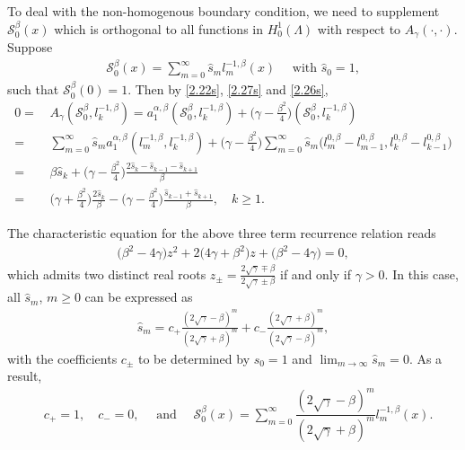 \documentclass[10pt,reqno]{amsart}
\theoremstyle{remark}
\theoremstyle{definition}
\begin{document}
To deal with the non-homogenous boundary condition,  we need to
supplement $\mathcal{S}_0^{\beta}(x)$   which is  orthogonal to all functions in  $H^{1}_0(\Lambda)$ with respect to $A_{\gamma}(\cdot,\cdot)$.
Suppose
\begin{align*}
\mathcal{S}_0^{\beta}(x) = \sum_{m=0}^{\infty}\hat s_m l_m^{-1,\beta}(x) \quad \text{ with }  \hat s_0 = 1,
\end{align*}
such that $\mathcal{S}_0^{\beta}(0)=1$.
Then by \eqref{2.22s}, \eqref{2.27s} and \eqref{2.26s},
\begin{align*}
0 =&\, A_{\gamma}(\mathcal{S}_0^{\beta},l_k^{-1,\beta})  = a_{1}^{\alpha,\beta}(\mathcal{S}_0^{\beta},l_k^{-1,\beta}) + \big(\gamma-\frac{\beta^2}{4}\big) (\mathcal{S}_0^{\beta},l_k^{-1,\beta})
\\
=&\,  {\displaystyle\sum}_{m=0}^{\infty}  \hat s_m a_{1}^{\alpha,\beta}(l_m^{-1,\beta}, l_k^{-1,\beta})
 + \big(\gamma-\frac{\beta^2}{4}\big)  {\displaystyle\sum}_{m=0}^{\infty}  \hat s_m  \big(   l_m^{0,\beta}-l_{m-1}^{0,\beta},  l_k^{0,\beta}-l_{k-1}^{0,\beta} \big)
\\
=&\, \beta  \hat s_k +  \big(\gamma-\frac{\beta^2}{4}\big)  \frac{2\hat s_k - \hat s_{k-1}-\hat s_{k+1}}{\beta}
\\
=&\, \big(\gamma+\frac{\beta^2}{4}\big) \frac{2\hat s_k}{\beta} - \big(\gamma-\frac{\beta^2}{4}\big)  \frac{\hat s_{k-1}+\hat s_{k+1}}{\beta}
,\quad  k\ge 1.
\end{align*}

The  characteristic  equation for the above three term recurrence relation reads
\begin{align*}
(\beta^2-4\gamma\big) z^2 + 2\big(4\gamma+\beta^2 \big) z + (\beta^2-4\gamma\big)=0,
\end{align*}
which admits  two distinct real roots  $z_{\pm}=\displaystyle  \frac{2\sqrt{\gamma}\mp\beta }{ 2\sqrt{\gamma}\pm \beta}
$
if and only if $\gamma> 0$.  In this case,
all  $\hat s_m$, $m\ge 0$ can be expressed as
\begin{align}
\label{coefSeq}
   \hat s_m = c_{+}  \frac{(2\sqrt{\gamma} - \beta )^m}{ (2\sqrt{\gamma}+\beta )^m} + c_{-}  \frac{(2\sqrt{\gamma}+\beta )^m}{( 2\sqrt{\gamma}-\beta  )^m},
\end{align}
with the coefficients $c_{\pm}$ to be determined by $\hat s_0=1$ and $\lim_{m\to \infty} \hat s_m=0$.
As a result,
\begin{align*}
   &c_{+}=1, \quad c_{-}=0,
   \quad \text{ and }\quad
    \mathcal{S}_0^{\beta}(x) = \sum_{m=0}^{\infty} \dfrac{(2\sqrt{\gamma} - \beta )^m}{ (2\sqrt{\gamma}+\beta )^m} l_m^{-1,\beta}(x).
   \end{align*}
\end{document}
